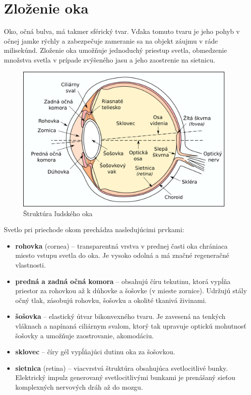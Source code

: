 \section{Zloženie oka}\label{sec:oko}
Oko, očná bulva, má takmer sférický tvar. Vďaka tomuto tvaru je jeho pohyb v očnej jamke rýchly a zabezpečuje zameranie sa na objekt záujmu v ráde milisekúnd\cite{}.
Zloženie oka umožňuje jednoduchý priestup svetla, obmedzenie množstva svetla v prípade zvýšeného jasu a jeho zaostrenie na sietnicu.

\begin{figure}[h]
  \centering
  \includegraphics[width=11cm]{img/Eyesection.png}
  \caption{Štruktúra ľudského oka\cite{retina}}
\end{figure}

Svetlo pri priechode okom prechádza nasledujúcimi prvkami\cite{zloz_oka}:
\begin{itemize}
\item \textbf{rohovka} (cornea) -- transparentná vrstva v prednej časti oka chrániaca miesto vstupu svetla do oka. Je vysoko odolná a má značné regeneračné vlastnosti.
\item \textbf{predná a zadná očná komora} -- obsahujú číru tekutinu, ktorá vypĺňa priestor za rohovkou až k dúhovke a šošovke (v mieste zornice). Udržujú stály očný tlak, zásobujú rohovku, šošovku a okolité tkanivá živinami\cite{zmysly}.
\item \textbf{šošovka} -- elastický útvar bikonvexného tvaru. Je zavesená na tenkých vláknach a napínaná ciliárnym svalom, ktorý tak upravuje optickú mohutnosť šošovky a umožňuje zaostrovanie, akomodáciu.
\item \textbf{sklovec} -- číry gél vypĺňajúci dutinu oka za šošovkou.
\item \textbf{sietnica} (retina) -- viacvrstvá štruktúra obsahujúca svetlocitlivé bunky. Elektrický impulz generovaný svetlocitlivými bunkami je prenášaný sieťou komplexných nervových dráh až do mozgu.
\end{itemize}

